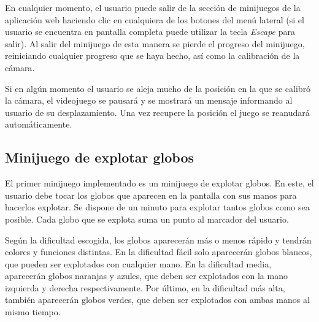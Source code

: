 

En cualquier momento, el usuario puede salir de la sección de minijuegos de la aplicación web
haciendo clic en cualquiera de los botones del menú lateral (si el usuario se encuentra en
pantalla completa puede utilizar la tecla \textit{Escape} para salir). Al salir del minijuego de
esta manera se pierde el progreso del minijuego, reiniciando cualquier progreso que se haya hecho,
así como la calibración de la cámara.

Si en algún momento el usuario se aleja mucho de la posición en la que se calibró la cámara,
el videojuego se pausará y se mostrará un mensaje informando al usuario de su desplazamiento. Una
vez recupere la posición el juego se reanudará automáticamente.

\subsection{Minijuego de explotar globos}
\label{sec:minijuego-globos}
El primer minijuego implementado es un minijuego de explotar globos. En este, el usuario debe
tocar los globos que aparecen en la pantalla con sus manos para hacerlos explotar. Se dispone
de un minuto para explotar tantos globos como sea posible. Cada globo que se explota suma un
punto al marcador del usuario.

Según la dificultad escogida, los globos aparecerán más o menos rápido y tendrán colores y
funciones distintas. En la dificultad fácil solo aparecerán globos blancos, que pueden ser
explotados con cualquier mano. En la dificultad media, aparecerán globos naranjas y azules,
que deben ser explotados con la mano izquierda y derecha respectivamente. Por último, en
la dificultad más alta, también aparecerán globos verdes, que deben ser explotados con
ambas manos al mismo tiempo.


